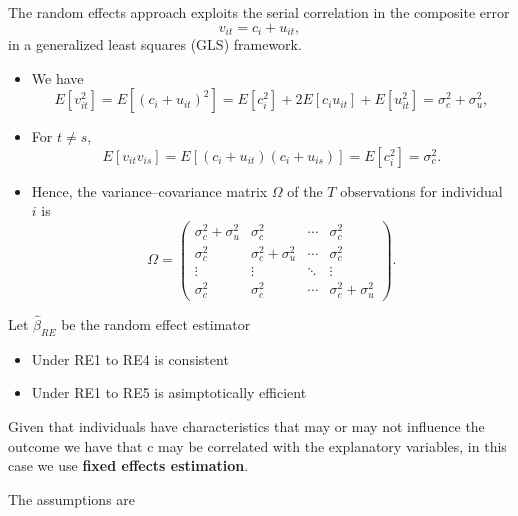 The random effects approach exploits the serial correlation in the composite error
\[
v_{it} = c_i + u_{it},
\]
in a generalized least squares (GLS) framework.

\begin{itemize}
    \item We have
    \[
    E[v_{it}^2]
    = E[(c_i + u_{it})^2]
    = E[c_i^2] + 2E[c_i u_{it}] + E[u_{it}^2]
    = \sigma_c^2 + \sigma_u^2,
    \tag{7}
    \]

    \item For \( t \neq s \),
    \[
    E[v_{it} v_{is}]
    = E[(c_i + u_{it})(c_i + u_{is})]
    = E[c_i^2]
    = \sigma_c^2.
    \tag{8}
    \]

    \item Hence, the variance--covariance matrix \( \Omega \) of the $T$ observations for individual $i$ is
    \[
    \Omega =
    \begin{pmatrix}
    \sigma_c^2 + \sigma_u^2 & \sigma_c^2 & \cdots & \sigma_c^2 \\
    \sigma_c^2 & \sigma_c^2 + \sigma_u^2 & \cdots & \sigma_c^2 \\
    \vdots & \vdots & \ddots & \vdots \\
    \sigma_c^2 & \sigma_c^2 & \cdots & \sigma_c^2 + \sigma_u^2
    \end{pmatrix}.
    \]
\end{itemize}

Let $\hat{\beta}_{RE}$ be the random effect estimator

\begin{itemize}
    \item Under RE1 to RE4 is consistent
    \item Under RE1 to RE5 is asimptotically efficient
\end{itemize}


\vspace{15pt}

Given that individuals have characteristics that may or may not influence the outcome we have that c may be correlated with the explanatory variables, in this case we use \textbf{fixed effects estimation}.

The assumptions are 


